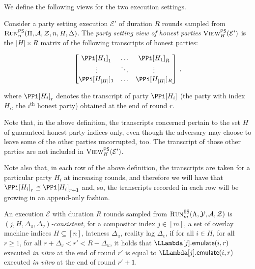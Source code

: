 We define the following views for the two execution settings.

\begin{definition}
  Consider a party setting execution $\mathcal{E}'$ of duration $R$ rounds
  sampled from
  $\textsc{Run}^{\textsf{PS}}_n(\Pi, \mathcal{A}, \mathcal{Z}, n, H, \Delta)$.
  The \emph{party setting view of honest parties} $\textsc{View}^{\textsf{PS}}_H(\mathcal{E}')$
  is the $|H|\times R$ matrix of the following transcripts of honest parties:

  \[
  \begin{bmatrix}
    \PPi[H_1]_1 &\ldots& \PPi[H_1]_R\\
         \vdots &\ddots& \vdots     \\
    \PPi[H_{|H|}]_1 &\ldots& \PPi[H_{|H|}]_R
  \end{bmatrix}\,,
  \]

  where $\PPi[H_i]_r$ denotes the transcript of party $\PPi[H_i]$
  (the party with index $H_i$, the $i^\text{th}$ honest party)
  obtained at the end of round $r$.
\end{definition}

Note that, in the above definition, the transcripts concerned pertain to the
set $H$ of guaranteed honest party indices only, even though the adversary may choose
to leave some of the other parties uncorrupted, too. The transcript of
those other parties are not included in $\textsc{View}^{\textsf{PS}}_H(\mathcal{E}')$.

Note also that, in each row of the above definition, the transcripts
are taken for a particular party $H_i$ at increasing rounds, and therefore
we will have that $\PPi[H_i]_r \preceq \PPi[H_i]_{r+1}$ and, so, the transcripts
recorded in each row will be growing in an append-only fashion.

\begin{definition}
  An execution $\mathcal{E}$ with duration $R$ rounds sampled from
  $\textsc{Run}^{\textsf{ES}}_m(\Lambda, \mathcal{Y}, \mathcal{A}, \mathcal{Z})$
  is \emph{$(j,H,\Delta_u,\Delta_v)$-\emph{consistent}},
  for a compositor index $j \in [m]$,
  a set of overlay machine indices $H \subseteq [n]$,
  lateness $\Delta_u$,
  reality lag $\Delta_v$,
  if
  for all $i \in H$, for all $r \geq 1$,
  for all $r + \Delta_v < r' < R - \Delta_u$,
  it holds that
  $\LLambda[j].\emulateMachine(i, r)$ executed \emph{in vitro} at the end of round $r'$
  is equal to
  $\LLambda[j].\emulateMachine(i, r)$ executed \emph{in vitro} at the end of round $r' + 1$.
\end{definition}

